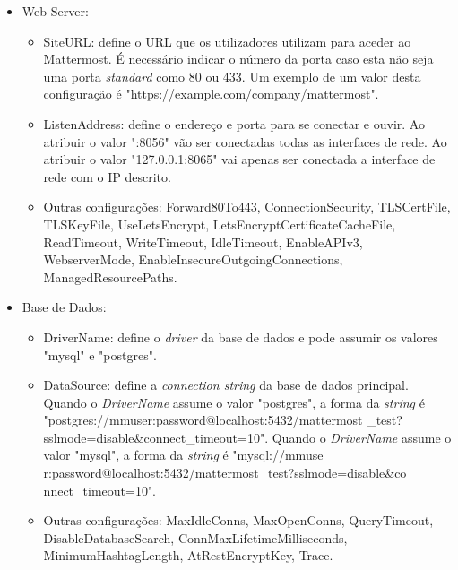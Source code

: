 \begin{itemize}

    \item Web Server:
    
    \begin{itemize}
        \item SiteURL: define o URL que os utilizadores utilizam para aceder ao Mattermost. É necessário indicar o número da porta caso esta não seja uma porta \textit{standard} como 80 ou 433. Um exemplo de um valor desta configuração é "https://example.com/company/mattermost".
        \\
        \item ListenAddress: define o endereço e porta para se conectar e ouvir. Ao atribuir o valor ":8056" vão ser conectadas todas as interfaces de rede. Ao atribuir o valor "127.0.0.1:8065" vai apenas ser conectada a interface de rede com o IP descrito.
        \\
        \item Outras configurações: Forward80To443, ConnectionSecurity, TLSCertFile, TLSKeyFile, 
        UseLetsEncrypt, LetsEncryptCertificateCacheFile, ReadTimeout, WriteTimeout, IdleTimeout, EnableAPIv3, WebserverMode, EnableInsecureOutgoingConnections, ManagedResourcePaths.
    \end{itemize}

    \item Base de Dados:
    
    \begin{itemize}
        \item DriverName: define o \textit{driver} da base de dados e pode assumir os valores "mysql" e "postgres".
        \\
        \item DataSource: define a \textit{connection string} da
        base de dados principal.
        Quando o \textit{DriverName} assume o valor "postgres", a forma da \textit{string} é "postgres://mmuser:password@localhost:5432/mattermost
        \_test?sslmode=disable\&connect\_timeout=10". 
        Quando o \textit{DriverName} assume o  valor "mysql", a forma da \textit{string} é "mysql://mmuse
        r:password@localhost:5432/mattermost\_test?sslmode=disable\&co
        nnect\_timeout=10".
        \\
        \item Outras configurações: MaxIdleConns, MaxOpenConns, QueryTimeout, DisableDatabaseSearch, ConnMaxLifetimeMilliseconds, MinimumHashtagLength, AtRestEncryptKey, Trace.
    \end{itemize}
    

\end{itemize}
